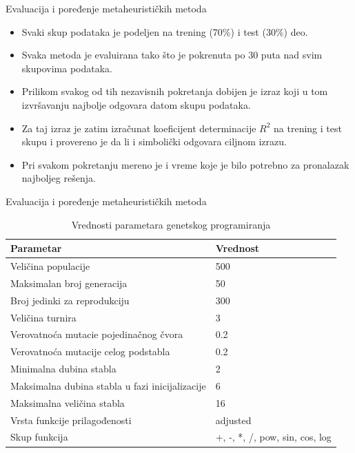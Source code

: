 \documentclass{beamer}
\begin{document}
\begin{frame}{Evaluacija i poređenje metaheurističkih metoda}
\begin{itemize}
    \item Svaki skup podataka je podeljen na trening (70\%) i test (30\%) deo.
    \item Svaka metoda je evaluirana tako što je pokrenuta po 30 puta nad svim skupovima podataka.
    \item Prilikom svakog od tih nezavisnih pokretanja dobijen je izraz koji u tom izvršavanju najbolje odgovara datom skupu podataka. 
    \item Za taj izraz je zatim izračunat koeficijent determinacije $R^2$ na trening i test skupu i provereno je da li i simbolički odgovara ciljnom izrazu.
    \item Pri svakom pokretanju mereno je i vreme koje je bilo potrebno za pronalazak najboljeg rešenja.
\end{itemize}
\end{frame}


\begin{frame}{Evaluacija i poređenje metaheurističkih metoda}
\scriptsize
\begin{table}[ht]
\caption{Vrednosti parametara genetskog programiranja} 
\label{tbl:gpParameters}
\centering
\begin{tabular}{l l} %
\hline 
Parametar & Vrednost \\ [0.5ex] 
\hline 
Veličina populacije & 500  \\ 
Maksimalan broj generacija & 50  \\
Broj jedinki za reprodukciju & 300  \\
Veličina turnira & 3 \\
Verovatnoća mutacie pojedinačnog čvora & 0.2  \\
Verovatnoća mutacije celog podstabla & 0.2  \\ 
Minimalna dubina stabla & 2 \\
Maksimalna dubina stabla u fazi inicijalizacije & 6 \\
Maksimalna veličina stabla & 16 \\
Vrsta funkcije prilagođenosti & adjusted \\ 
Skup funkcija &  +, -, *, /, pow, sin, cos, log \\ [1ex] %
\hline 
\end{tabular}
\end{table}
\end{frame}
\end{document}
